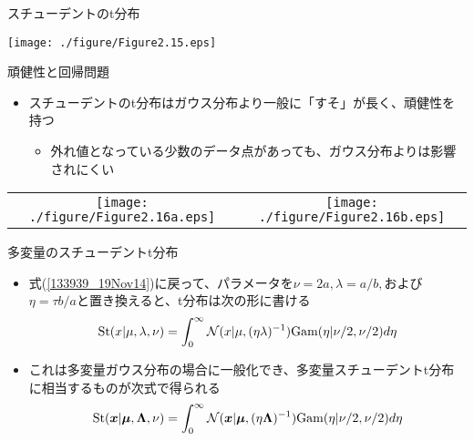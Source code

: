 \begin{frame}{スチューデントのt分布}
 \begin{center}
  \texttt{[image: ./figure/Figure2.15.eps]}
 \end{center}
\end{frame}

\begin{frame}{頑健性と回帰問題}
 \begin{itemize}
  \item スチューデントのt分布はガウス分布より一般に「すそ」が長く、\alert{頑健性}を持つ
        \begin{itemize}
         \item 外れ値となっている少数のデータ点があっても、ガウス分布よりは影響されにくい
        \end{itemize}
 \end{itemize}
        \begin{tabular}[tb]{cc}
         \texttt{[image: ./figure/Figure2.16a.eps]}
         &
         \texttt{[image: ./figure/Figure2.16b.eps]}
        \end{tabular}
\end{frame}

\begin{frame}{多変量のスチューデントt分布}
 \begin{itemize}
  \item 式(\ref{133939_19Nov14})に戻って、パラメータを$\nu=2a,\lambda=a/b,$および$\eta=\tau b/a$と置き換えると、t分布は次の形に書ける
        \begin{equation}
         {\rm St}(x|\mu,\lambda,\nu) = \int_{0}^{\infty}\mathcal{N}(x|\mu, (\eta\lambda)^{-1}){\rm Gam}(\eta|\nu/2,\nu/2)d\eta
        \end{equation}
  \item これは多変量ガウス分布の場合に一般化でき、多変量スチューデントt分布に相当するものが次式で得られる
        \begin{equation}
         {\rm St}(\bm{x}|\bm{\mu},\bm{\Lambda},\nu) = \int_{0}^{\infty}\mathcal{N}(\bm{x}|\bm{\mu}, (\eta\bm{\Lambda})^{-1}){\rm Gam}(\eta|\nu/2,\nu/2)d\eta
        \end{equation}
 \end{itemize}
\end{frame}


